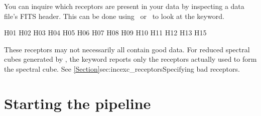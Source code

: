 \documentclass[11pt,oneside,chapters]{starlink}
\begin{document}
You can inquire which receptors are present in your data by inspecting
a data file's FITS header. This can be done using \fitslist\ or
\fitsval\ to look at the  keyword.

\begin{terminalv}
H01 H02 H03 H04 H05 H06 H07 H08 H09 H10 H11 H12 H13 H15
\end{terminalv}

These receptors may not necessarily all contain good data.  For
reduced spectral cubes generated by \makecube, the 
keyword reports only the receptors actually used to form the spectral
cube.  See \cref{Section}{sec:incexc_receptors}{Specifying bad
receptors}.


\section{Starting the pipeline}
\label{sec:runpl}
\end{document}
